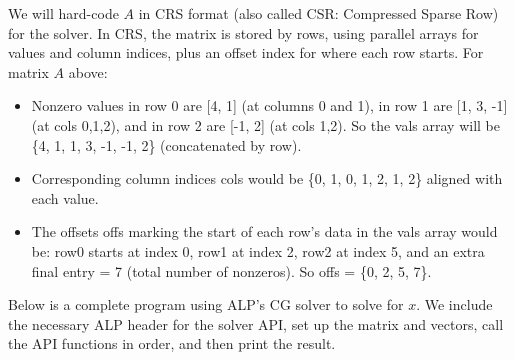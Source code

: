 We will hard-code $A$ in CRS format (also called CSR: Compressed Sparse Row) for the solver. In CRS, the matrix is stored by rows, using parallel arrays for values and column indices, plus an offset index for where each row starts. For matrix $A$ above:



\begin{itemize}
\item Nonzero values in row 0 are [4, 1] (at columns 0 and 1), in row 1 are [1, 3, -1] (at cols 0,1,2), and in row 2 are [-1, 2] (at cols 1,2). So the vals array will be \{4, 1, 1, 3, -1, -1, 2\} (concatenated by row).
\item Corresponding column indices cols would be \{0, 1, 0, 1, 2, 1, 2\} aligned with each value.
\item The offsets offs marking the start of each row’s data in the vals array would be: row0 starts at index 0, row1 at index 2, row2 at index 5, and an extra final entry = 7 (total number of nonzeros). So offs = \{0, 2, 5, 7\}.
\end{itemize}


Below is a complete program using ALP’s CG solver to solve for $x$. We include the necessary ALP header
for the solver API, set up the matrix and vectors, call the API functions in order, and then print the result.

